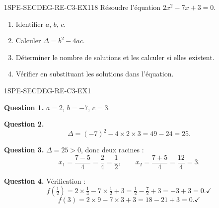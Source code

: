 


\begin{exercice}{1SPE-SECDEG-RE-C3-EX1}{1}{8}
Résoudre l'équation $2x^2 - 7x + 3 = 0$.
\begin{enumerate}
  \item Identifier $a$, $b$, $c$.
  \item Calculer $\Delta = b^2 - 4ac$.
  \item Déterminer le nombre de solutions et les calculer si elles existent.
  \item Vérifier en substituant les solutions dans l'équation.
\end{enumerate}
\end{exercice}


\begin{corrige}{1SPE-SECDEG-RE-C3-EX1}


\textbf{Question 1.} $a = 2$, $b = -7$, $c = 3$.


\textbf{Question 2.}
\[
\Delta = (-7)^2 - 4 \times 2 \times 3 = 49 - 24 = 25.
\]


\textbf{Question 3.} $\Delta = 25 > 0$, donc deux racines :
\[
x_1 = \frac{7 - 5}{4} = \frac{2}{4} = \frac{1}{2}, \qquad
x_2 = \frac{7 + 5}{4} = \frac{12}{4} = 3.
\]

\textbf{Question 4.} Vérification :
\[
f\!\left(\tfrac{1}{2}\right) = 2 \times \tfrac{1}{4} - 7 \times \tfrac{1}{2} + 3 = \tfrac{1}{2} - \tfrac{7}{2} + 3 = -3 + 3 = 0. \checkmark
\]
\[
f(3) = 2 \times 9 - 7 \times 3 + 3 = 18 - 21 + 3 = 0. \checkmark
\]

\end{corrige}

